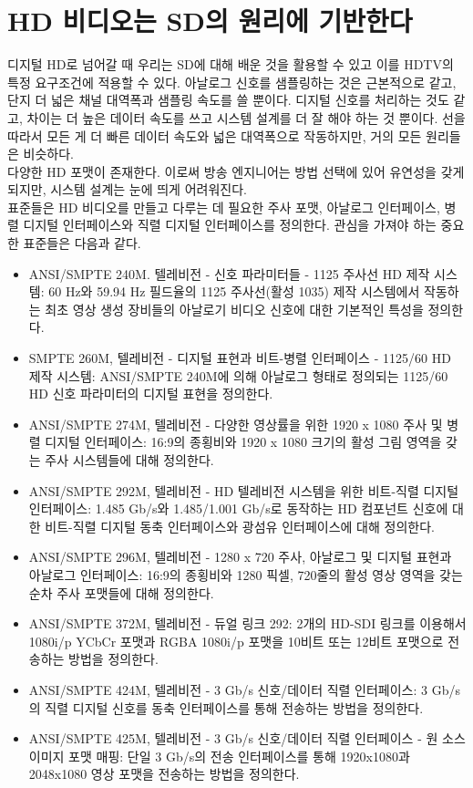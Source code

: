 \section{HD 비디오는 SD의 원리에 기반한다}
디지털 HD로 넘어갈 때 우리는 SD에 대해 배운 것을 활용할 수 있고 이를 HDTV의 특정 요구조건에 적용할 수 있다. 아날로그 신호를 샘플링하는 것은 근본적으로 같고, 단지 더 넓은 채널 대역폭과 샘플링 속도를 쓸 뿐이다.
디지털 신호를 처리하는 것도 같고, 차이는 더 높은 데이터 속도를 쓰고 시스템 설계를 더 잘 해야 하는 것 뿐이다. 선을 따라서 모든 게 더 빠른 데이터 속도와 넓은 대역폭으로 작동하지만, 거의 모든 원리들은 비슷하다.
\\
다양한 HD 포맷이 존재한다. 이로써 방송 엔지니어는 방법 선택에 있어 유연성을 갖게 되지만, 시스템 설계는 눈에 띄게 어려워진다.
\\
표준들은 HD 비디오를 만들고 다루는 데 필요한 주사 포맷, 아날로그 인터페이스, 병렬 디지털 인터페이스와 직렬 디지털 인터페이스를 정의한다. 관심을 가져야 하는 중요한 표준들은 다음과 같다.
\begin{itemize}
    \item ANSI/SMPTE 240M. 텔레비전 - 신호 파라미터들 - 1125 주사선 HD 제작 시스템: 60 Hz와 59.94 Hz 필드율의 1125 주사선(활성 1035) 제작 시스템에서 작동하는 최초 영상 생성 장비들의 아날로기 비디오 신호에 대한 기본적인 특성을 정의한다.
    \item SMPTE 260M, 텔레비전 - 디지털 표현과 비트-병렬 인터페이스 - 1125/60 HD 제작 시스템: ANSI/SMPTE 240M에 의해 아날로그 형태로 정의되는 1125/60 HD 신호 파라미터의 디지털 표현을 정의한다.
    \item ANSI/SMPTE 274M, 텔레비전 - 다양한 영상률을 위한 1920 x 1080 주사 및 병렬 디지털 인터페이스: 16:9의 종횡비와 1920 x 1080 크기의 활성 그림 영역을 갖는 주사 시스템들에 대해 정의한다.
    \item ANSI/SMPTE 292M, 텔레비전 - HD 텔레비전 시스템을 위한 비트-직렬 디지털 인터페이스: 1.485 Gb/s와 1.485/1.001 Gb/s로 동작하는 HD 컴포넌트 신호에 대한 비트-직렬 디지털 동축 인터페이스와 광섬유 인터페이스에 대해 정의한다.
    \item ANSI/SMPTE 296M, 텔레비전 - 1280 x 720 주사, 아날로그 및 디지털 표현과 아날로그 인터페이스: 16:9의 종횡비와 1280 픽셀, 720줄의 활성 영상 영역을 갖는 순차 주사 포맷들에 대해 정의한다.
    \item ANSI/SMPTE 372M, 텔레비전 - 듀얼 링크 292: 2개의 HD-SDI 링크를 이용해서 1080i/p YCbCr 포맷과 RGBA 1080i/p 포맷을 10비트 또는 12비트 포맷으로 전송하는 방법을 정의한다.
    \item ANSI/SMPTE 424M, 텔레비전 - 3 Gb/s 신호/데이터 직렬 인터페이스: 3 Gb/s의 직렬 디지털 신호를 동축 인터페이스를 통해 전송하는 방법을 정의한다.
    \item ANSI/SMPTE 425M, 텔레비전 - 3 Gb/s 신호/데이터 직렬 인터페이스 - 원 소스 이미지 포맷 매핑: 단일 3 Gb/s의 전송 인터페이스를 통해 1920x1080과 2048x1080 영상 포맷을 전송하는 방법을 정의한다.
\end{itemize}

